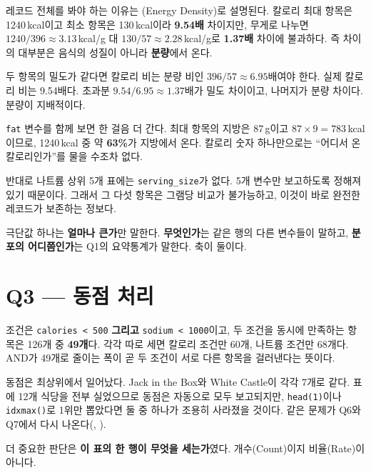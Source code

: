 레코드 전체를 봐야 하는 이유는 (Energy Density)로 설명된다. 칼로리
최대 항목은 1240\,kcal이고 최소 항목은 130\,kcal이라 \textbf{9.54배} 차이지만, 무게로
나누면 $1240/396 \approx 3.13$\,kcal/g 대 $130/57 \approx 2.28$\,kcal/g로 \textbf{1.37배}
차이에 불과하다. 즉 차이의 대부분은 음식의 성질이 아니라 \textbf{분량}에서 온다.

\begin{example}
\label{ex:hw1-density}
두 항목의 밀도가 같다면 칼로리 비는 분량 비인 $396/57 \approx 6.95$배여야 한다.
실제 칼로리 비는 9.54배다. 초과분 $9.54/6.95 \approx 1.37$배가 밀도 차이이고,
나머지가 분량 차이다. 분량이 지배적이다.
\end{example}

\texttt{fat} 변수를 함께 보면 한 걸음 더 간다. 최대 항목의 지방은 87\,g이고
$87 \times 9 = 783$\,kcal이므로, 1240\,kcal 중 약 \textbf{63\%}가 지방에서 온다.
칼로리 숫자 하나만으로는 ``어디서 온 칼로리인가''를 물을 수조차 없다.

반대로 나트륨 상위 5개 표에는 \texttt{serving\_size}가 없다. 5개 변수만 보고하도록
정해져 있기 때문이다. 그래서 그 다섯 항목은 그램당 비교가 불가능하고, 이것이 바로
완전한 레코드가 보존하는 정보다.

\begin{keyidea}
극단값 하나는 \textbf{얼마나 큰가}만 말한다. \textbf{무엇인가}는 같은 행의 다른
변수들이 말하고, \textbf{분포의 어디쯤인가}는 Q1의 요약통계가 말한다. 축이 둘이다.
\end{keyidea}

\section{Q3 --- 동점 처리}
\label{sec:hw1-q3}

조건은 \texttt{calories < 500} \textbf{그리고} \texttt{sodium < 1000}이고, 두 조건을
동시에 만족하는 항목은 126개 중 \textbf{49개}다. 각각 따로 세면 칼로리 조건만 60개,
나트륨 조건만 68개다. AND가 49개로 줄이는 폭이 곧 두 조건이 서로 다른 항목을 걸러낸다는
뜻이다.

동점은 최상위에서 일어났다. Jack in the Box와 White Castle이 각각 7개로 같다. 표에
12개 식당을 전부 실었으므로 동점은 자동으로 모두 보고되지만, \texttt{head(1)}이나
\texttt{idxmax()}로 1위만 뽑았다면 둘 중 하나가 조용히 사라졌을 것이다. 같은 문제가
Q6와 Q7에서 다시 나온다(, ).

더 중요한 판단은 \textbf{이 표의 한 행이 무엇을 세는가}였다. 개수(Count)이지 비율(Rate)이
아니다.

